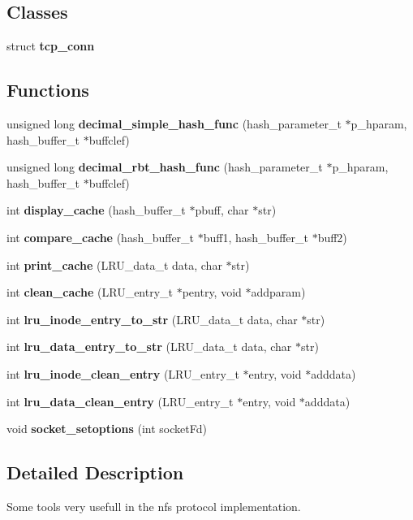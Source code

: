 \subsection*{Classes}
\begin{CompactItemize}
\item 
struct {\bf tcp\_\-conn}
\end{CompactItemize}
\subsection*{Functions}
\begin{CompactItemize}
\item 
unsigned long {\bf decimal\_\-simple\_\-hash\_\-func} (hash\_\-parameter\_\-t $\ast$p\_\-hparam, hash\_\-buffer\_\-t $\ast$buffclef)
\item 
unsigned long {\bf decimal\_\-rbt\_\-hash\_\-func} (hash\_\-parameter\_\-t $\ast$p\_\-hparam, hash\_\-buffer\_\-t $\ast$buffclef)
\item 
int {\bf display\_\-cache} (hash\_\-buffer\_\-t $\ast$pbuff, char $\ast$str)
\item 
int {\bf compare\_\-cache} (hash\_\-buffer\_\-t $\ast$buff1, hash\_\-buffer\_\-t $\ast$buff2)
\item 
int {\bf print\_\-cache} (LRU\_\-data\_\-t data, char $\ast$str)
\item 
int {\bf clean\_\-cache} (LRU\_\-entry\_\-t $\ast$pentry, void $\ast$addparam)
\item 
int {\bf lru\_\-inode\_\-entry\_\-to\_\-str} (LRU\_\-data\_\-t data, char $\ast$str)
\item 
int {\bf lru\_\-data\_\-entry\_\-to\_\-str} (LRU\_\-data\_\-t data, char $\ast$str)
\item 
int {\bf lru\_\-inode\_\-clean\_\-entry} (LRU\_\-entry\_\-t $\ast$entry, void $\ast$adddata)
\item 
int {\bf lru\_\-data\_\-clean\_\-entry} (LRU\_\-entry\_\-t $\ast$entry, void $\ast$adddata)
\item 
void {\bf socket\_\-setoptions} (int socket\-Fd)
\end{CompactItemize}


\subsection{Detailed Description}
Some tools very usefull in the nfs protocol implementation. 

